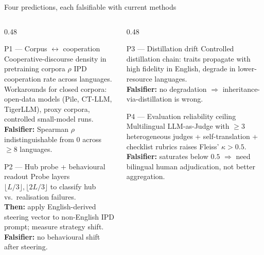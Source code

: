 \documentclass[11pt,aspectratio=169]{beamer}
\begin{document}
\begin{frame}{Four predictions, each falsifiable with current methods}
    \begin{columns}[T]
        \begin{column}{0.48\textwidth}
            \begin{block}{P1 --- Corpus $\leftrightarrow$ cooperation}
                \footnotesize Cooperative-discourse density in pretraining corpora $\rho$ IPD cooperation rate across languages.\\
                Workarounds for closed corpora: open-data models (Pile, CT-LLM, TigerLLM), proxy corpora, controlled small-model runs.\\[4pt]
                \textbf{Falsifier:} Spearman $\rho$ indistinguishable from 0 across $\geq 8$ languages.
            \end{block}
            \vspace{0.2cm}
            \begin{block}{P2 --- Hub probe + behavioural readout}
                \footnotesize Probe layers $\lfloor L/3 \rfloor, \lfloor 2L/3 \rfloor$ to classify hub vs.\ realisation failures.\\
                \textbf{Then:} apply English-derived steering vector to non-English IPD prompt; measure strategy shift.\\[4pt]
                \textbf{Falsifier:} no behavioural shift after steering.
            \end{block}
        \end{column}
        \begin{column}{0.48\textwidth}
            \begin{block}{P3 --- Distillation drift}
                \footnotesize Controlled distillation chain: traits propagate with high fidelity in English, degrade in lower-resource languages.\\[4pt]
                \textbf{Falsifier:} no degradation $\Rightarrow$ inheritance-via-distillation is wrong.
            \end{block}
            \vspace{0.2cm}
            \begin{block}{P4 --- Evaluation reliability ceiling}
                \footnotesize Multilingual LLM-as-Judge with $\geq 3$ heterogeneous judges + self-translation + checklist rubrics raises Fleiss' $\kappa > 0.5$.\\[4pt]
                \textbf{Falsifier:} saturates below $0.5$ $\Rightarrow$ need bilingual human adjudication, not better aggregation.
            \end{block}
        \end{column}
    \end{columns}
\end{frame}
\end{document}
